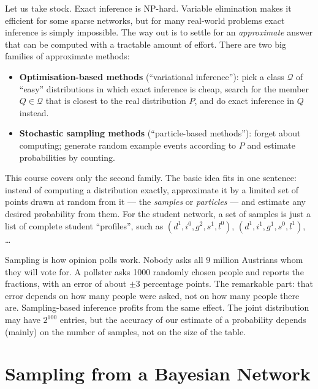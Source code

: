 \documentclass[11pt, oneside]{book}
\let\originalsection\section
\renewcommand{\section}{\Needspace{7\baselineskip}\originalsection}
\begin{document}
Let us take stock. Exact inference is NP-hard. Variable elimination makes it
efficient for some sparse networks, but for many real-world problems exact
inference is simply impossible. The way out is to settle for an
\emph{approximate} answer that can be computed with a tractable amount of
effort. There are two big families of approximate methods:
\begin{itemize}
  \item \textbf{Optimisation-based methods} (``variational inference''): pick
    a class $\mathcal{Q}$ of ``easy'' distributions in which exact inference is
    cheap, search for the member $Q \in \mathcal{Q}$ that is closest to the
    real distribution $P$, and do exact inference in $Q$ instead.
  \item \textbf{Stochastic sampling methods} (``particle-based methods''):
    forget about computing; generate random example events according to $P$
    and estimate probabilities by counting.
\end{itemize}
This course covers only the second family. The basic idea fits in one
sentence: instead of computing a distribution exactly, approximate it by a
limited set of points drawn at random from it --- the \emph{samples} or
\emph{particles} --- and estimate any desired probability from them. For the
student network, a set of samples is just a list of complete student
``profiles'', such as $(d^1, i^0, g^2, s^1, l^0)$, $(d^1, i^1, g^1, s^0,
l^1)$, \ldots

\begin{intbox}[unbreakable]
Sampling is how opinion polls work. Nobody asks all 9 million Austrians whom
they will vote for. A pollster asks 1000 randomly chosen people and reports
the fractions, with an error of about $\pm 3$ percentage points. The
remarkable part: that error depends on how many people were asked, not on how
many people there are. Sampling-based inference profits from the same effect.
The joint distribution may have $2^{100}$ entries, but the accuracy of our
estimate of a probability depends (mainly) on the number of samples, not on
the size of the table.
\end{intbox}

\section{Sampling from a Bayesian Network}
\label{sec:forward-sampling}
\end{document}
